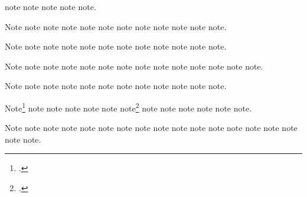 \documentclass[a4paper,12pt]{report}
\begin{document}
note\autocite{nyt:obittrevor} note\autocite{nyt:trevorobit}
note\autocite{obrien:recycle} note\autocite[arithmetical]{oed:cdrom}
note\autocite{nytrumpet:art}.

Note\autocite{pelikan:christian} note\autocite{petroff:impurity}
note\autocite{osborne:poison} note\autocite{phibbs:diary}
note\autocite{palmatary:pottery} note\autocite{pirumova}
note\autocite{pelikan:christian} note\autocite{petroff:impurity}
note\autocite{plato:republic:gr} note\autocite{plato:total}
note\autocite{plato:timaeus:gr} note\autocite{polakow:afterw}.

Note\autocite{phibbs:diary}
note\autocite[360e--361b]{plato:republic:gr} note\autocite{pirumova}
note\autocite{polakow:afterw} note\autocite{pollan:plant}
note\autocite{powell:email} note\autocite{plato:total}
note\autocite[37d]{plato:timaeus:gr} note\autocite{prose:intro}
note\autocite{ratliff:review} note\autocite{reaves:rosen}
note\autocite{pollan:plant}.

Note\autocite{powell:email} note\autocite{prose:intro}
note\autocite{rodman:walk} note\autocite{roosevelt:speech}
note\autocite{angry:birds} note\autocite{ross:thesis}
note\autocite{ratliff:review} note\autocite{rozner:liberation}
note\autocite{rubinstein:chopin} note\autocite{saberhagen:beluga}
note\autocite{schellinger:novel} note\autocite{reaves:rosen}
note\autocite{schubert:muellerin} note\autocite{rodman:walk}.

Note\autocite{schweitzer:bach} note\autocite{roosevelt:speech}
note\autocite{ross:thesis} note\autocite{angry:birds}
note\autocite{rozner:liberation} note\autocite{rubinstein:chopin}
note\autocite{sechzer:women} note\autocite{schellinger:novel}
note\autocite{sereny:cries} note\autocite{schubert:muellerin}
note\autocite{saberhagen:beluga} note\autocite{schweitzer:bach}.

Note\footnote{.}
note\autocite{shapey:partita} note\autocite{sechzer:women}
note\autocite{sirosh:visualcortex} note\autocite{sereny:cries}
note\autocite{silver:gawain}
note\footnote{.}
note\autocite{soltes:georgia} note\autocite{sirosh:visualcortex}
note\autocite{spock:interview} note\autocite{shapey:partita}
note\autocite{stenger:privacy} note\autocite{silver:gawain}.

Note\autocite{tillich:system} note\autocite{soltes:georgia}
note\autocite{spock:interview} note\autocite{times:guide}
note\autocite{twain:audio} note\autocite{virginia:plantation}
note\autocite{rihanna:umbrella} note\autocite{stenger:privacy}
note\autocite{chicago:manual} note\autocite{twain:audio}
note\autocite[2:45]{tillich:system} note\autocite[police
ranks]{times:guide} note\autocite{rihanna:umbrella}
note\autocite{virginia:plantation} note\autocite{chicago:manual}
note\autocite{unsigned:ranke} note\autocite{herwign:office}
note\autocite{verdi:corsaro}.
\end{document}
